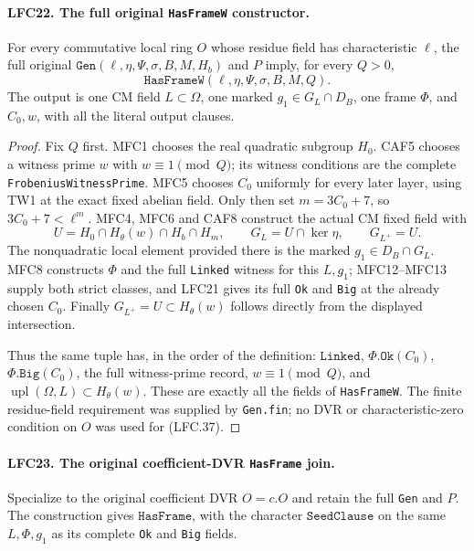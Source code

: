 \paragraph{LFC22. The full original \texttt{HasFrameW} constructor.}
\label{claim:LFC22}
For every commutative local ring \(O\) whose residue
field has characteristic \(\ell\), the full original
\(\texttt{Gen}(\ell,\eta,\Psi,\sigma,B,M,H_b)\) and \(P\)
imply, for every \(Q>0\),
\[
                \texttt{HasFrameW}
                     (\ell,\eta,\Psi,\sigma,B,M,Q).
                                                        \tag{LFC.37}
\]
The output is one CM field \(L\subset\Omega\), one
marked \(g_1\in G_L\cap D_B\), one frame \(\Phi\),
and \(C_0,w\), with all the literal output clauses.

\begin{proof}
Fix \(Q\) first.  MFC1 chooses the real quadratic
subgroup \(H_0\).  CAF5 chooses a witness prime \(w\)
with \(w\equiv1\pmod Q\); its witness conditions are
the complete \texttt{FrobeniusWitnessPrime}.
MFC5 chooses \(C_0\) uniformly for every later layer,
using TW1 at the exact fixed abelian field.
Only then set \(m=3C_0+7\), so
\(3C_0+7<\ell^m\).
MFC4, MFC6 and CAF8 construct the actual CM fixed
field with
\[
  U=H_0\cap H_\theta(w)\cap H_b\cap H_m,\qquad
  G_L=U\cap\ker\eta,\qquad G_{L^+}=U.
 \]
The nonquadratic local element provided there is the
marked \(g_1\in D_B\cap G_L\).
MFC8 constructs \(\Phi\) and the full \texttt{Linked}
witness for this \(L,g_1\); MFC12--MFC13 supply both
strict classes, and LFC21 gives its full \texttt{Ok}
and \texttt{Big} at the already chosen \(C_0\).
Finally \(G_{L^+}=U\subset H_\theta(w)\) follows directly
from the displayed intersection.

Thus the same tuple has, in the order of the definition:
\(\texttt{Linked}\), \(\Phi.\texttt{Ok}(C_0)\),
\(\Phi.\texttt{Big}(C_0)\), the full witness-prime record,
\(w\equiv1\pmod Q\), and
\(\operatorname{upl}(\Omega,L)\subset H_\theta(w)\).
These are exactly all the fields of \texttt{HasFrameW}.
The finite residue-field requirement was supplied by
\texttt{Gen.fin}; no DVR or characteristic-zero condition
on \(O\) was used for (LFC.37).
\end{proof}

\paragraph{LFC23. The original coefficient-DVR \texttt{HasFrame} join.}
\label{claim:LFC23}
Specialize to the original coefficient DVR \(O=c.O\)
and retain the full \texttt{Gen} and \(P\).
The construction gives \(\texttt{HasFrame}\), with
the character \(\texttt{SeedClause}\) on the same
\(L,\Phi,g_1\) as its complete \texttt{Ok} and
\texttt{Big} fields.

